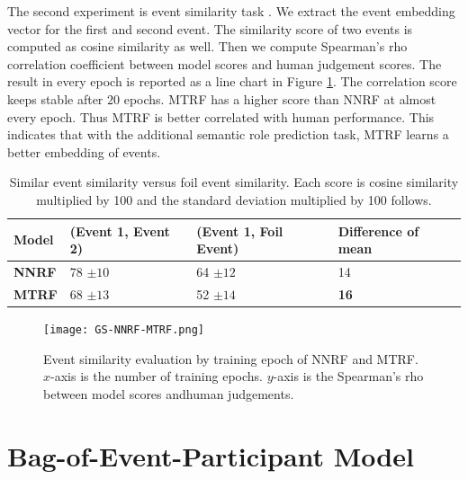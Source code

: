 \documentclass[a4paper]{article}
\begin{document}
The second experiment is event similarity task \citep{grefenstette2015concrete}. We extract the event embedding vector for the first and second event. The similarity score of two events is computed as cosine similarity as well. Then we compute Spearman's rho correlation coefficient between model scores and human judgement scores. The result in every epoch is reported as a line chart in Figure \ref{fig:GS-NNRF-MTRF}. The correlation score keeps stable after $20$ epochs. MTRF has a higher score than NNRF at almost every epoch. Thus MTRF is better correlated with human performance. This indicates that with the additional semantic role prediction task, MTRF learns a better embedding of events. 


\begin{table}[t]
\centering
\begin{tabular}{l|ll|l}
    \textbf{Model}  &   (Event 1, Event 2)   &    (Event 1, Foil Event)    &  Difference of mean  \\ \hline
    \textbf{NNRF}   &   78 $\pm 10$ &   64 $\pm 12$ &   14  \\
    \textbf{MTRF}   &   68 $\pm 13$ &   52 $\pm 14$ &   \textbf{16}  \\
\end{tabular}
\caption{\label{tab:foil-mtrf} Similar event similarity versus foil event similarity. Each score is cosine similarity multiplied by 100 and the standard deviation multiplied by 100 follows.}
\end{table}
% 
% 
% 
%


\begin{figure}[t]
\centering
\texttt{[image: GS-NNRF-MTRF.png]}
\caption{\label{fig:GS-NNRF-MTRF} Event similarity evaluation by training epoch of NNRF and MTRF. $x$-axis is the number of training epochs. $y$-axis is the Spearman's rho between model scores andhuman judgements. }
\end{figure}






\newpage
\section{Bag-of-Event-Participant Model} \label{sec:bop}
\end{document}
